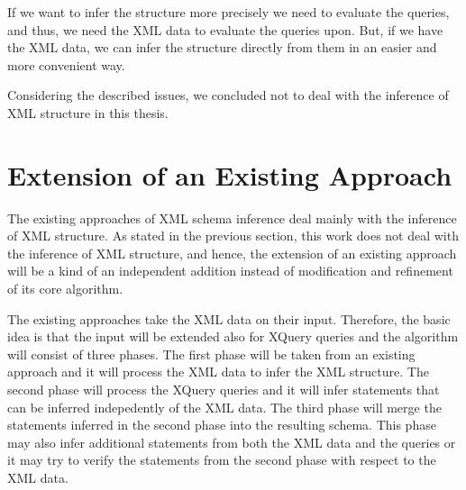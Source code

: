 If we want to infer the structure more precisely we need to evaluate the queries, and thus, we need the XML data to evaluate the queries upon. But, if we have the XML data, we can infer the structure directly from them in an easier and more convenient way.


Considering the described issues, we concluded not to deal with the inference of XML structure in this thesis.

\section{Extension of an Existing Approach}
The existing approaches of XML schema inference deal mainly with the inference of XML structure. As stated in the previous section, this work does not deal with the inference of XML structure, and hence, the extension of an existing approach will be a kind of an independent addition instead of modification and refinement of its core algorithm.

The existing approaches take the XML data on their input. Therefore, the basic idea is that the input will be extended also for XQuery queries and the algorithm will consist of three phases. The first phase will be taken from an existing approach and it will process the XML data to infer the XML structure. The second phase will process the XQuery queries and it will infer statements that can be inferred indepedently of the XML data. The third phase will merge the statements inferred in the second phase into the resulting schema. This phase may also infer additional statements from both the XML data and the queries or it may try to verify the statements from the second phase with respect to the XML data.
